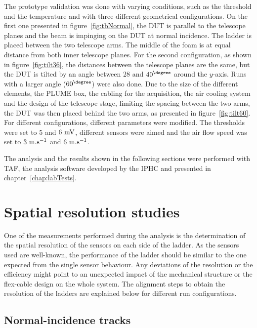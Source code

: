     The prototype validation was done with varying conditions, such as the threshold and the temperature and with three different geometrical configurations.
    On the first one presented in figure~\ref{fig:tbNormal}, the \gls{DUT} is parallel to the telescope planes and the beam is impinging on the \gls{DUT} at normal incidence.
    The ladder is placed between the two telescope arms.
    The middle of the foam is at equal distance from both inner telescope planes.
    For the second configuration, as shown in figure~\ref{fig:tilt36}, the distances between the telescope planes are the same, but the \gls{DUT} is tilted by an angle between $28$ and $40^{\degree}$ around the $y$-axis.
    Runs with a larger angle ($60^{\degree}$) were also done.
    Due to the size of the different elements, the \gls{PLUME} box, the cabling for the acquisition, the air cooling system and the design of the telescope stage, limiting the spacing between the two arms, the \gls{DUT} was then placed behind the two arms, as presented in figure~\ref{fig:tilt60}.
    For different configurations, different parameters were modified.
    The thresholds were set to $5$ and $6~\rm{mV}$, different sensors were aimed and the air flow speed was set to $3~\rm{m.s}^{-1}$ and $6~\rm{m.s}^{-1}$.
 

    The analysis and the results shown in the following sections were performed with \gls{TAF}, the analysis software developed by the \gls{IPHC} and presented in chapter~\ref{chap:labTests}.

  \section{Spatial resolution studies}
   
    One of the measurements performed during the analysis is the determination of the spatial resolution of the sensors on each side of the ladder.
    As the sensors used are well-known, the performance of the ladder should be similar to the one expected from the single sensor behaviour.
    Any deviations of the resolution or the efficiency might point to an unexpected impact of the mechanical structure or the flex-cable design on the whole system.
    The alignment steps to obtain the resolution of the ladders are explained below for different run configurations. 

    \subsection{Normal-incidence tracks}
     
